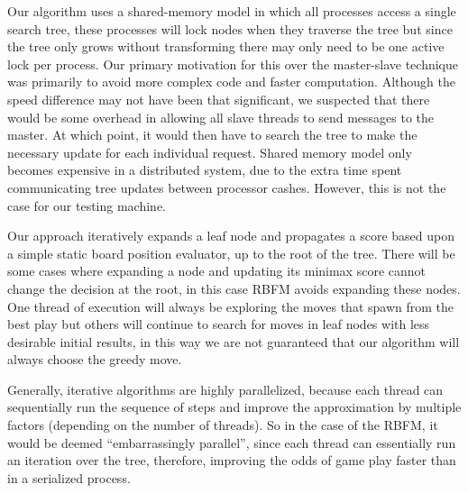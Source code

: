 \documentclass[conference]{IEEEtran}
\begin{document}
Our algorithm uses a shared-memory model in which all processes access a single search tree, these processes will lock nodes when they traverse the tree but since the tree only grows without transforming there may only need to be one active lock per process. Our primary motivation for this over the master-slave technique was primarily to avoid more complex code and faster computation. Although the speed difference may not have been that significant, we suspected that there would be some overhead in allowing all slave threads to send messages to the master. At which point, it would then have to search the tree to make the necessary update for each individual request. Shared memory model only becomes expensive in a distributed system, due to the extra time spent communicating tree updates between processor cashes. However, this is not the case for our testing machine.\par
Our approach iteratively expands a leaf node and propagates a score based upon a simple static board position evaluator, up to the root of the tree. There will be some cases where expanding a node and updating its minimax score cannot change the decision at the root, in this case RBFM avoids expanding these nodes. One thread of execution will always be exploring the moves that spawn from the best play but others will continue to search for moves in leaf nodes with less desirable initial results, in this way we are not guaranteed that our algorithm will always choose the greedy move.\par
Generally, iterative algorithms are highly parallelized, because each thread can sequentially run the sequence of steps and improve the approximation by multiple factors (depending on the number of threads). So in the case of the RBFM, it would be deemed “embarrassingly parallel”, since each thread can essentially run an iteration over the tree, therefore, improving the odds of game play faster than in a serialized process.
\end{document}
